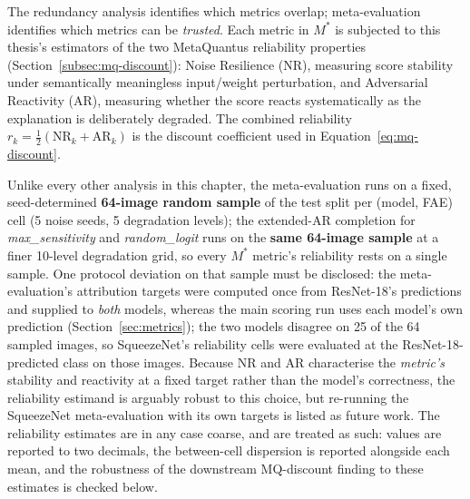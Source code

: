 The redundancy analysis identifies which metrics overlap; meta-evaluation
identifies which metrics can be \emph{trusted}. Each metric in $M^{*}$ is
subjected to this thesis's estimators of the two MetaQuantus reliability
properties (Section~\ref{subsec:mq-discount}): Noise Resilience (NR),
measuring score
stability under semantically meaningless input/weight perturbation, and
Adversarial Reactivity (AR), measuring whether the score reacts
systematically as
the explanation is deliberately degraded. The combined reliability
$r_k = \tfrac{1}{2}(\mathrm{NR}_k + \mathrm{AR}_k)$ is the discount coefficient
used in Equation~\eqref{eq:mq-discount}.

Unlike every other analysis in this chapter, the meta-evaluation runs on a
fixed, seed-determined \textbf{64-image random sample} of the test split per
(model, FAE) cell (5 noise seeds, 5 degradation levels); the extended-AR
completion for \emph{max\_sensitivity} and \emph{random\_logit} runs on the
\textbf{same 64-image sample} at a finer 10-level degradation grid, so every
$M^{*}$ metric's reliability rests on a single sample. One protocol
deviation on that sample must be disclosed: the meta-evaluation's
attribution targets were computed once from ResNet-18's predictions and
supplied to \emph{both} models, whereas the main scoring run uses each
model's own prediction (Section~\ref{sec:metrics}); the two models disagree
on 25 of the 64 sampled images, so SqueezeNet's reliability cells were
evaluated at the ResNet-18-predicted class on those images. Because NR and
AR characterise the \emph{metric's} stability and reactivity at a fixed
target rather than the model's correctness, the reliability estimand is
arguably robust to this choice, but re-running the SqueezeNet
meta-evaluation with its own targets is listed as future work. The
reliability
estimates are in any case
coarse, and are treated as such: values are reported to two decimals, the
between-cell dispersion is reported alongside each mean, and the
robustness of the downstream MQ-discount finding to these estimates is
checked below.

